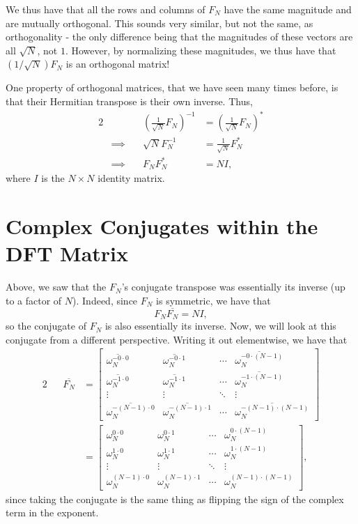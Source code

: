 \documentclass[letterpaper]{article}
\theoremstyle{remark}
\newcommand{\mat}[1]{\ensuremath{\begin{bmatrix}#1\end{bmatrix}}}
\newcommand{\eqn}[1]{\begin{alignat*}{2}#1\end{alignat*}}
\newcommand*{\thus}{&\implies\quad&}
\begin{document}
We thus have that all the rows and columns of $F_N$ have the same magnitude and are mutually orthogonal. This sounds very similar, but not the same, as orthogonality - the only difference being that the magnitudes of these vectors are all $\sqrt{N}$, not $1$. However, by normalizing these magnitudes, we thus have that $(1/\sqrt{N})F_N$ is an orthogonal matrix!

One property of orthogonal matrices, that we have seen many times before, is that their Hermitian transpose is their own inverse. Thus,
\eqn{
    && \left(\frac{1}{\sqrt{N}} F_N\right)^{-1} &= \left(\frac{1}{\sqrt{N}} F_N\right)^* \\
    \thus \sqrt{N} F_N^{-1} &= \frac{1}{\sqrt{N}} F_N^* \\
    \thus F_NF_N^* &= NI,
}
where $I$ is the $N \times N$ identity matrix.

\section{Complex Conjugates within the DFT Matrix}
Above, we saw that the $F_N$'s conjugate transpose was essentially its inverse (up to a factor of $N$). Indeed, since $F_N$ is symmetric, we have that
\[
    F_N\overline{F_N} = NI,
\]
so the conjugate of $F_N$ is also essentially its inverse. Now, we will look at this conjugate from a different perspective. Writing it out elementwise, we have that
\eqn{
    && \overline{F_N} &= \mat{
    \overline{\omega_N^{-0 \cdot 0}} & \overline{\omega_N^{-0 \cdot 1}} & \cdots & \overline{\omega_N^{-0 \cdot (N-1)}} \\
    \overline{\omega_N^{-1 \cdot 0}} & \overline{\omega_N^{-1 \cdot 1}} & \cdots & \overline{\omega_N^{-1 \cdot (N-1)}} \\
    \vdots & \vdots & \ddots & \vdots \\
    \overline{\omega_N^{-(N-1) \cdot 0}} & \overline{\omega_N^{-(N-1) \cdot 1}} & \cdots & \overline{\omega_N^{-(N-1) \cdot (N-1)}}} \\
    &&&= \mat{
    \omega_N^{0 \cdot 0} & \omega_N^{0 \cdot 1} & \cdots & \omega_N^{0 \cdot (N-1)} \\
    \omega_N^{1 \cdot 0} & \omega_N^{1 \cdot 1} & \cdots & \omega_N^{1 \cdot (N-1)} \\
    \vdots & \vdots & \ddots & \vdots \\
    \omega_N^{(N-1) \cdot 0} & \omega_N^{(N-1) \cdot 1} & \cdots & \omega_N^{(N-1) \cdot (N-1)}},
}
since taking the conjugate is the same thing as flipping the sign of the complex term in the exponent.
\end{document}
